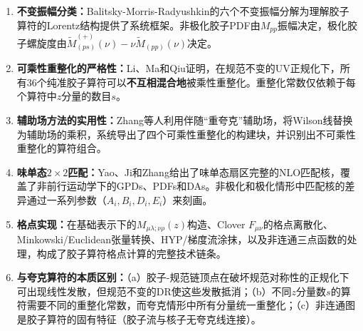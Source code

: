 \documentclass[12pt,a4paper]{ctexart}
\theoremstyle{definition}
\begin{document}
\begin{enumerate}
    \item \textbf{不变振幅分类：}Balitsky-Morris-Radyushkin的六个不变振幅分解为理解胶子算符的Lorentz结构提供了系统框架。非极化胶子PDF由$M_{pp}$振幅决定，极化胶子螺旋度由$\tilde{M}_{(ps)}^{(+)}(\nu) - \nu\tilde{M}_{(pp)}(\nu)$决定。

    \item \textbf{可乘性重整化的严格性：}Li、Ma和Qiu证明\cite{Li2018multiplicative}，在规范不变的UV正规化下，所有36个纯准胶子算符可以\textbf{不互相混合地}被乘性重整化。重整化常数仅依赖于每个算符中$z$分量的数目$s$。

    \item \textbf{辅助场方法的实用性：}Zhang等人\cite{Zhang2019}利用伴随``重夸克''辅助场，将Wilson线替换为辅助场的乘积，系统导出了四个可乘性重整化的构建块，并识别出不可乘性重整化的算符组合。

    \item \textbf{味单态$2\times2$匹配：}Yao、Ji和Zhang\cite{Yao2023}给出了味单态扇区完整的NLO匹配核，覆盖了非前行运动学下的GPDs、PDFs和DAs。非极化和极化情形中匹配核的差异通过一系列参数（$A_i, B_i, D_i, E_i$）来刻画。

    \item \textbf{格点实现：}在基础表示下的$M_{\mu\lambda;\nu\rho}(z)$构造、Clover $F_{\mu\nu}$的格点离散化、Minkowski/Euclidean张量转换、HYP/梯度流涂抹，以及非连通三点函数的处理，构成了胶子算符格点计算的完整技术链条。

    \item \textbf{与夸克算符的本质区别：}（a）胶子-规范链顶点在破坏规范对称性的正规化下可出现线性发散，但规范不变的DR使这些发散抵消；（b）不同$z$分量数$s$的算符需要不同的重整化常数，而夸克情形中所有分量统一重整化；（c）非连通图是胶子算符的固有特征（胶子流与核子无夸克线连接）。
\end{enumerate}
\end{document}
